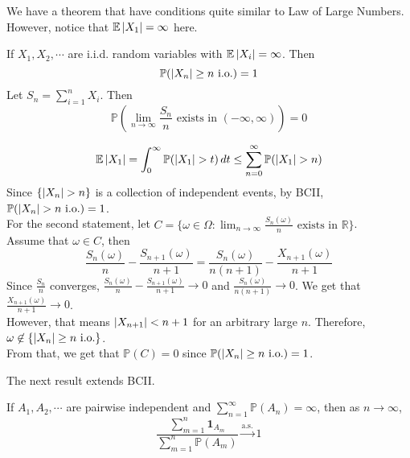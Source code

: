 \documentclass{huhtakm-template-book}
\newcommand{\prob}{\mathbb{P}}
\newcommand{\expect}{\mathbb{E}}
\begin{document}
We have a theorem that have conditions quite similar to Law of Large Numbers. However, notice that $\expect\abs{X_{1}}=\infty$ here.
\begin{thm}
	If $X_{1},X_{2},\cdots$ are i.i.d. random variables with $\expect\abs{X_{i}}=\infty$. Then
	\begin{equation*}
		\prob(\abs{X_{n}}\geq n\text{ i.o.})=1
	\end{equation*}
	Let $S_{n}=\sum_{i=1}^{n}X_{i}$. Then
	\begin{equation*}
		\prob\left(\lim_{n\to\infty}\frac{S_{n}}{n}\text{ exists in }(-\infty,\infty)\right)=0
	\end{equation*}
\end{thm}
\begin{proofing}
	\begin{equation*}
		\expect\abs{X_{1}}=\int_{0}^{\infty}\prob(\abs{X_{1}}>t)\,dt\leq\sum_{n=0}^{\infty}\prob(\abs{X_{1}}>n)
	\end{equation*}
	Since $\{\abs{X_{n}}>n\}$ is a collection of independent events, by BCII, $\prob(\abs{X_{n}}>n\text{ i.o.})=1$.\\
	For the second statement, let $C=\{\omega\in\Omega:\lim_{n\to\infty}\frac{S_{n}(\omega)}{n}\text{ exists in }\mathbb{R}\}$.\\
	Assume that $\omega\in C$, then
	\begin{equation*}
		\frac{S_{n}(\omega)}{n}-\frac{S_{n+1}(\omega)}{n+1}=\frac{S_{n}(\omega)}{n(n+1)}-\frac{X_{n+1}(\omega)}{n+1}
	\end{equation*}
	Since $\frac{S_{n}}{n}$ converges, $\frac{S_{n}(\omega)}{n}-\frac{S_{n+1}(\omega)}{n+1}\to 0$ and $\frac{S_{n}(\omega)}{n(n+1)}\to 0$. We get that $\frac{X_{n+1}(\omega)}{n+1}\to 0$.\\
	However, that means $\left|{X_{n+1}}\right|<n+1$ for an arbitrary large $n$. Therefore, $\omega\not\in\{\left|{X_{n}}\right|\geq n\text{ i.o.}\}$.\\
	From that, we get that $\prob(C)=0$ since $\prob(\abs{X_{n}}\geq n\text{ i.o.})=1$.
\end{proofing}
\newpage
The next result extends BCII.
\begin{thm}
	If $A_{1},A_{2},\cdots$ are pairwise independent and $\sum_{n=1}^{\infty}\prob(A_{n})=\infty$, then as $n\to\infty$,
	\begin{equation*}
		\frac{\sum_{m=1}^{n}\mathbf{1}_{A_{m}}}{\sum_{m=1}^{n}\prob(A_{m})}\xrightarrow{\text{a.s.}}1
	\end{equation*}
\end{thm}
\end{document}
